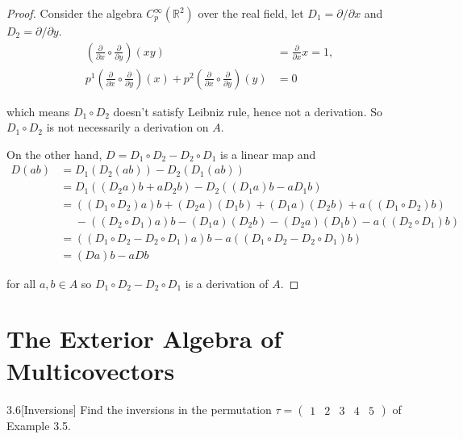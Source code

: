 \begin{proof}
	Consider the algebra \( C^{\infty}_{p}(\mathbb{R}^{2}) \) over the real field, let \( D_{1} = \partial/\partial x \)  and \( D_{2} = \partial/\partial y \).
	\begin{align*}
		\left(\frac{\partial}{\partial x}\circ \frac{\partial}{\partial y}\right)(xy)                                                                                         & = \frac{\partial}{\partial x} x = 1, \\
		p^{1}\left(\frac{\partial}{\partial x}\circ \frac{\partial}{\partial y}\right)(x) + p^{2}\left(\frac{\partial}{\partial x}\circ \frac{\partial}{\partial y}\right)(y) & = 0
	\end{align*}

	which means \( D_{1} \circ D_{2} \) doesn't satisfy Leibniz rule, hence not a derivation. So \( D_{1} \circ D_{2} \) is not necessarily a derivation on \( A \).

	On the other hand, \( D = D_{1}\circ D_{2} - D_{2}\circ D_{1} \) is a linear map and
	\begin{align*}
		D(ab) & = D_{1}(D_{2}(ab)) - D_{2}(D_{1}(ab))                                                               \\
		      & = D_{1}((D_{2}a)b + aD_{2}b) - D_{2}((D_{1}a)b - aD_{1}b)                                           \\
		      & = ((D_{1}\circ D_{2})a)b + (D_{2}a)(D_{1}b) + (D_{1}a)(D_{2}b) + a((D_{1}\circ D_{2})b)             \\
		      & \phantom{=} - ((D_{2}\circ D_{1})a)b - (D_{1}a)(D_{2}b) - (D_{2}a)(D_{1}b) - a((D_{2}\circ D_{1})b) \\
		      & = ((D_{1}\circ D_{2} - D_{2}\circ D_{1})a)b - a((D_{1}\circ D_{2} - D_{2}\circ D_{1})b)             \\
		      & = (Da)b - aDb
	\end{align*}

	for all \( a, b \in A \) so \( D_{1}\circ D_{2} - D_{2}\circ D_{1} \) is a derivation of \( A \).
\end{proof}

\section{The Exterior Algebra of Multicovectors}

\begin{exercise}{3.6}[Inversions]
	Find the inversions in the permutation \( \tau = \begin{pmatrix}1 & 2 & 3 & 4 & 5\end{pmatrix} \) of Example 3.5.
\end{exercise}

